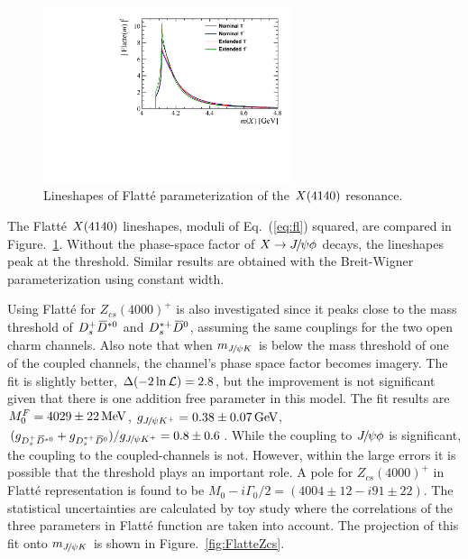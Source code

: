 \begin{figure}[bt]
\centering
\includegraphics[width=0.65\textwidth]{Figures/03_Zcs/06_Amplitude/Flatte/FlatteX}
\caption{Lineshapes of Flatt\'e parameterization of the $X(4140)$ resonance.}\label{fig:cmpfl}
\end{figure}


The Flatt\'e $X(4140)$ lineshapes, moduli of Eq.~(\ref{eq:fl}) squared, 
are compared in Figure.~\ref{fig:cmpfl}. 
Without the phase-space factor of $X\rightarrow{\ensuremath{{J\mskip -3mu/\mskip -2mu\psi}}} \phi$ decays, 
the lineshapes peak at the threshold. 
Similar results are obtained with the Breit-Wigner parameterization using constant width. 

Using Flatt\'e for $Z_{cs}(4000)^+$ is also investigated since it peaks close to the mass threshold of ${{D}^+_{s}} {{\kern 0.18em\overline{\kern -0.18em D}}{}^{*0}}$ and ${{D}^{*+}_{s}}{{\kern 0.18em\overline{\kern -0.18em D}}{}^0}$, 
assuming the same couplings for the two open charm channels. 
Also note that when $m_{{{J\mskip -3mu/\mskip -2mu\psi}} K}$ is below the mass threshold of one of the coupled channels, 
the channel's phase space factor becomes imagery. 
The fit is slightly better, $\Delta(-2\ln\mathcal{L})=2.8$,
but the improvement is not significant given that there is one addition free parameter in this model.
The fit results are $M^F_0=4029\pm22\text{\,Me\kern -0.1em V}$, $g_{{{J\mskip -3mu/\mskip -2mu\psi}}{{K}^+}}=0.38\pm0.07\text{\,Ge\kern -0.1em V}$, $(g_{{{D}^+_{s}} {{\kern 0.18em\overline{\kern -0.18em D}}{}^{*0}}}+g_{{{D}^{*+}_{s}}{{\kern 0.18em\overline{\kern -0.18em D}}{}^0}})/g_{{{J\mskip -3mu/\mskip -2mu\psi}}{{K}^+}}=0.8\pm0.6$. 
While the coupling to ${{J\mskip -3mu/\mskip -2mu\psi}}\phi$ is significant, 
the coupling to the coupled-channels is not. 
However, within the large errors it is possible that the threshold plays an important role.
A pole for $Z_{cs}(4000)^+$ in Flatt\'e representation is found to be $M_0-i\Gamma_0/2=(4004\pm12 -i 91\pm22)$\mev. 
The statistical uncertainties are calculated by toy study where the correlations of the three parameters in Flatt\'e function are taken into account. 
The projection of this fit onto $m_{{{J\mskip -3mu/\mskip -2mu\psi}} K}$ is shown in Figure.~\ref{fig:FlatteZcs}.


